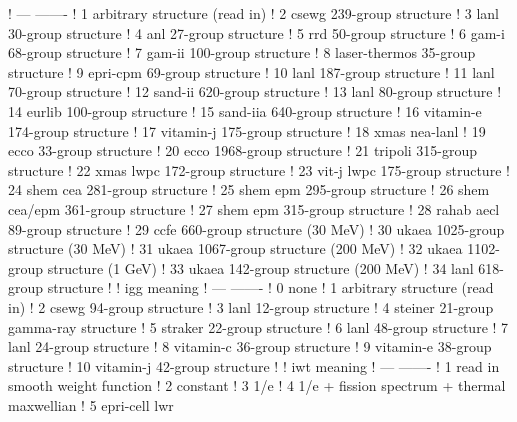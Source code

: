 \begin{ccode}
   !     ---          -------
   !      1           arbitrary structure (read in)
   !      2           csewg 239-group structure
   !      3           lanl 30-group structure
   !      4           anl 27-group structure
   !      5           rrd 50-group structure
   !      6           gam-i 68-group structure
   !      7           gam-ii 100-group structure
   !      8           laser-thermos 35-group structure
   !      9           epri-cpm 69-group structure
   !     10           lanl 187-group structure
   !     11           lanl 70-group structure
   !     12           sand-ii 620-group structure
   !     13           lanl 80-group structure
   !     14           eurlib 100-group structure
   !     15           sand-iia 640-group structure
   !     16           vitamin-e 174-group structure
   !     17           vitamin-j 175-group structure
   !     18           xmas nea-lanl
   !     19           ecco  33-group structure
   !     20           ecco 1968-group structure
   !     21           tripoli 315-group structure
   !     22           xmas lwpc 172-group structure
   !     23           vit-j lwpc 175-group structure
   !     24           shem cea 281-group structure
   !     25           shem epm 295-group structure
   !     26           shem cea/epm 361-group structure
   !     27           shem epm 315-group structure
   !     28           rahab aecl 89-group structure
   !     29           ccfe   660-group structure  (30 MeV)
   !     30           ukaea 1025-group structure  (30 MeV)
   !     31           ukaea 1067-group structure (200 MeV)
   !     32           ukaea 1102-group structure   (1 GeV)
   !     33           ukaea  142-group structure (200 MeV)
   !     34           lanl 618-group structure
   !
   !     igg          meaning
   !     ---          -------
   !      0           none
   !      1           arbitrary structure (read in)
   !      2           csewg 94-group structure
   !      3           lanl 12-group structure
   !      4           steiner 21-group gamma-ray structure
   !      5           straker 22-group structure
   !      6           lanl 48-group structure
   !      7           lanl 24-group structure
   !      8           vitamin-c 36-group structure
   !      9           vitamin-e 38-group structure
   !     10           vitamin-j 42-group structure
   !
   !     iwt          meaning
   !     ---          -------
   !      1           read in smooth weight function
   !      2           constant
   !      3           1/e
   !      4           1/e + fission spectrum + thermal maxwellian
   !      5           epri-cell lwr

\end{ccode}
